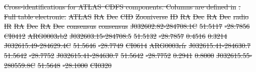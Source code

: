 \documentclass[11pt, a4paper]{book}
\providecommand{\DIFdeltex}[1]{{\protect\color{red}\sout{#1}}}                      %
\providecommand{\DIFdel}[1]{\texorpdfstring{\DIFdeltex{#1}}{}} %
\begin{document}
{%
\DIFdel{Cross-identifications for ATLAS~CDFS components. Columns are defined in }%
\DIFdel{. Full table electronic.}}
\DIFdel{ATLAS }%
\DIFdel{RA }%
\DIFdel{Dec }%
\DIFdel{CID }%
\DIFdel{Zooniverse }%
\DIFdel{ID }%
\DIFdel{RA }%
\DIFdel{Dec }%
\DIFdel{RA }%
\DIFdel{Dec }%
\DIFdel{radio }%
\DIFdel{IR }%
\DIFdel{RA }%
\DIFdel{Dec }%
\DIFdel{RA }%
\DIFdel{Dec }%
\DIFdel{consensus }%
\DIFdel{consensus}%
\DIFdel{J032602.82-284708.1C }%
\DIFdel{51.5117 }%
\DIFdel{-28.7856 }%
\DIFdel{CI0412 }%
\DIFdel{ARG0003rb2 }%
\DIFdel{J032603.15-284708.5 }%
\DIFdel{51.5132 }%
\DIFdel{-28.7857 }%
\DIFdel{0.4516 }%
\DIFdel{0.3214 }%
\DIFdel{J032615.49-284629.4C }%
\DIFdel{51.5646 }%
\DIFdel{-28.7749 }%
\DIFdel{CI0614 }%
\DIFdel{ARG0003rfr }%
\DIFdel{J032615.41-284630.7 }%
\DIFdel{51.5642 }%
\DIFdel{-28.7752 }%
\DIFdel{J032615.41-284630.7 }%
\DIFdel{51.5642 }%
\DIFdel{-28.7752 }%
\DIFdel{0.2941 }%
\DIFdel{0.8000 }%
\DIFdel{J032615.55-280559.8C }%
\DIFdel{51.5648 }%
\DIFdel{-28.1000 }%
\DIFdel{CI0320 }%
\end{document}
